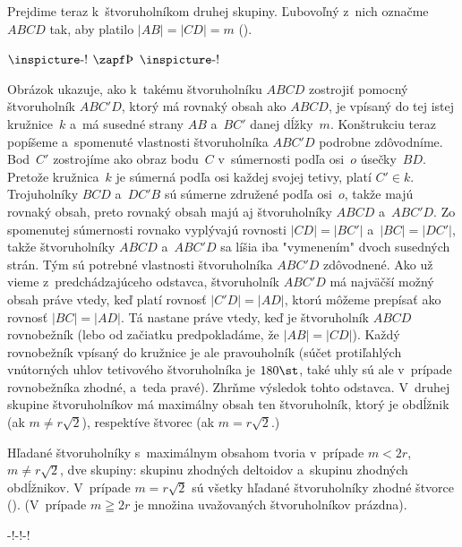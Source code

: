 {\smallskip
Prejdime teraz k~štvoruholníkom druhej skupiny. Ľubovoľný z~nich
označme $ABCD$ tak, aby platilo $|AB|=|CD|=m$ (\obr).

\bigskip
\centerline{$\vcenter{\hbox{\inspicture-!}}$\hss
            $\vcenter{\hbox{\zapf\char222 }}$\hss
            $\vcenter{\hbox{\inspicture-!}}$\qquad}
\centerline\Obr
\bigskip

Obrázok ukazuje, ako k~takému štvoruholníku $ABCD$ zostrojiť
pomocný štvoruholník $ABC'D$, ktorý má rovnaký obsah ako $ABCD$,
je vpísaný do tej istej kružnice~$k$ a~má susedné strany $AB$ a~$BC'$
danej dĺžky~$m$. Konštrukciu teraz popíšeme a~spomenuté vlastnosti
štvoruholníka $ABC'D$ podrobne zdôvodníme. Bod~$C'$ zostrojíme
ako obraz bodu~$C$ v~súmernosti podľa osi~$o$ úsečky~$BD$.
Pretože kružnica~$k$ je súmerná podľa osi každej svojej tetivy,
platí $C'\in k$. Trojuholníky $BCD$ a~$DC'B$ sú súmerne
združené podľa osi~$o$, takže majú rovnaký obsah, preto rovnaký
obsah majú aj štvoruholníky $ABCD$ a~$ABC'D$. Zo spomenutej
súmernosti rovnako vyplývajú rovnosti $|CD|=|BC'|$ a~$|BC|=|DC'|$,
takže štvoruholníky $ABCD$ a~$ABC'D$ sa líšia iba "vymenením"
dvoch susedných strán. Tým sú potrebné vlastnosti štvoruholníka
$ABC'D$ zdôvodnené. Ako už vieme z~predchádzajúceho odstavca,
štvoruholník $ABC'D$ má najväčší možný obsah práve vtedy, keď platí
rovnosť $|C'D|=|AD|$, ktorú môžeme prepísať ako rovnosť
$|BC|=|AD|$. Tá nastane práve vtedy, keď je štvoruholník $ABCD$
rovnobežník (lebo od začiatku predpokladáme, že $|AB|=|CD|$).
Každý rovnobežník vpísaný do kružnice je ale pravouholník (súčet
protiľahlých vnútorných uhlov tetivového štvoruholníka je $180\st$,
také uhly sú ale v~prípade rovnobežníka zhodné, a~teda
pravé). Zhrňme výsledok tohto odstavca. V~druhej skupine
štvoruholníkov má maximálny obsah ten štvoruholník, ktorý je
obdĺžnik (ak $m\ne r\sqrt2$), respektíve štvorec (ak $m=r\sqrt2$.)

\zaver
Hľadané štvoruholníky s~maximálnym obsahom
tvoria v~prípade $m<2r$, $m\ne r\sqrt2$, dve skupiny: skupinu
zhodných deltoidov a~skupinu zhodných obdĺžnikov. V~prípade
$m=r\sqrt2$ sú všetky hľadané štvoruholníky zhodné štvorce
(\obr). (V~prípade $m\geqq2r$ je množina uvažovaných štvoruholníkov
prázdna).

\midinsert
\centerline{\inspicture-!\hss\inspicture-!\hss\inspicture-!}
\centerline\Obr
\endinsert}

